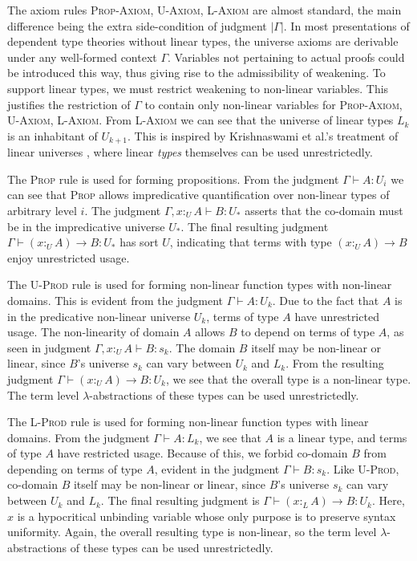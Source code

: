 \documentclass[sigplan,screen,review,authordraft]{acmart}
\theoremstyle{definition}
\newcommand{\rname}[1]{\textsc{\footnotesize #1}}
\newcommand{\pure}[1]{|#1|}
\newcommand{\utype}{:_{\scriptscriptstyle U}}
\newcommand{\ltype}{:_{\scriptscriptstyle L}}
\begin{document}
  The axiom rules \rname{Prop-Axiom}, \rname{U-Axiom}, \rname{L-Axiom} are almost standard, the main difference being the extra side-condition of judgment $\pure{\Gamma}$. In most presentations of dependent type theories without linear types, the universe axioms are derivable under any well-formed context $\Gamma$. Variables not pertaining to actual proofs could be introduced this way, thus giving rise to the admissibility of weakening. To support linear types, we must restrict weakening to non-linear variables. This justifies the restriction of $\Gamma$ to contain only non-linear variables for \rname{Prop-Axiom}, \rname{U-Axiom}, \rname{L-Axiom}. From \rname{L-Axiom} we can see that the universe of linear types $L_k$ is an inhabitant of $U_{k+1}$. This is inspired by Krishnaswami et al.'s treatment of linear universes \cite{neel15}, where linear \textit{types} themselves can be used unrestrictedly.

  The \rname{Prop} rule is used for forming propositions. From the judgment $\Gamma \vdash A : U_i$ we can see that \rname{Prop} allows impredicative quantification over non-linear types of arbitrary level $i$. The judgment $\Gamma, x \utype A \vdash B : U_*$ asserts that the co-domain must be in the impredicative universe $U_*$. The final resulting judgment $\Gamma \vdash (x \utype A) \rightarrow B : U_*$ has sort $U$, indicating that terms with type $(x \utype A) \rightarrow B$ enjoy unrestricted usage.

  The \rname{U-Prod} rule is used for forming non-linear function types with non-linear domains. This is evident from the judgment $\Gamma \vdash A : U_k$. Due to the fact that $A$ is in the predicative non-linear universe $U_k$, terms of type $A$ have unrestricted usage. The non-linearity of domain $A$ allows $B$ to depend on terms of type $A$, as seen in judgment $\Gamma, x \utype A \vdash B : s_k$. The domain $B$ itself may be non-linear or linear, since $B$'s universe $s_k$ can vary between $U_k$ and $L_k$. From the resulting judgment $\Gamma \vdash (x \utype A) \rightarrow B : U_k$, we see that the overall type is a non-linear type. The term level $\lambda$-abstractions of these types can be used unrestrictedly.

  The \rname{L-Prod} rule is used for forming non-linear function types with linear domains. From the judgment $\Gamma \vdash A : L_k$, we see that $A$ is a linear type, and terms of type $A$ have restricted usage. Because of this, we forbid co-domain $B$ from depending on terms of type $A$, evident in the judgment $\Gamma \vdash B : s_k$. Like \rname{U-Prod}, co-domain $B$ itself may be non-linear or linear, since $B$'s universe $s_k$ can vary between $U_k$ and $L_k$. The final resulting judgment is $\Gamma \vdash (x \ltype A) \rightarrow B : U_k$. Here, $x$ is a hypocritical unbinding variable whose only purpose is to preserve syntax uniformity. Again, the overall resulting type is non-linear, so the term level $\lambda$-abstractions of these types can be used unrestrictedly.
\end{document}
